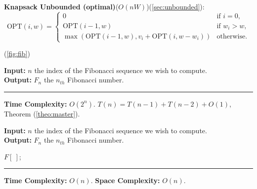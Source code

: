 \noindent
\textbf{Knapsack Unbounded (optimal)}($O(nW)$)(\ref{sec:unbounded}):
\[
\text{OPT}(i, w) = 
\begin{cases} 
    0 & \text{if } i = 0, \\
    \text{OPT}(i-1, w) & \text{if } w_i > w, \\
    \max\left(\text{OPT}(i-1, w), v_i + \text{OPT}(i, w - w_i)\right) & \text{otherwise.}
\end{cases}
\]

\newpage

(\ref{fig:fib})
\begin{Func}
    \noindent
    \textbf{Input:} $n$ the index of the Fibonacci sequence we wish to compute.\\
    \textbf{Output:} $F_n$ the $n_{th}$ Fibonacci number.\\

    \vspace{-.5em}
    \begin{algorithm}[H]
        \SetAlgoLined
    \end{algorithm}
    \noindent
    \rule{\textwidth}{0.4pt}
    \textbf{Time Complexity:} $O(2^n)$. $T(n)=T(n-1)+T(n-2)+O(1)$, Theorem (\ref{theo:master}).
\end{Func}

\begin{Func}

    \textbf{Input:} $n$ the index of the Fibonacci sequence we wish to compute.\\
    \textbf{Output:} $F_n$ the $n_{th}$ Fibonacci number.\\

    \vspace{-.5em}
    \begin{algorithm}[H]
        \SetAlgoLined
        $F[\ ]$; 
    \end{algorithm}
    \noindent
    \rule{\textwidth}{0.4pt}
    \textbf{Time Complexity:} $O(n)$.
    \textbf{Space Complexity:} $O(n)$.
\end{Func}

